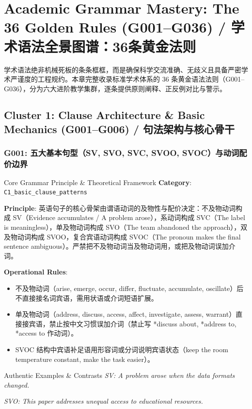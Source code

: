 \chapter{Academic Grammar Mastery: The 36 Golden Rules (G001--G036) / 学术语法全景图谱：36条黄金法则}\label{ch:grammar36}
学术语法绝非机械死板的条条框框，而是确保科学交流准确、无歧义且具备严密学术严谨度的工程规约。本章完整收录标准学术体系的 36 条黄金语法法则（G001--G036），分为六大进阶教学集群，逐条提供原则阐释、正反例对比与警示。

\section{Cluster 1: Clause Architecture \& Basic Mechanics (G001--G006) / 句法架构与核心骨干}
\subsection{G001: 五大基本句型（SV, SVO, SVC, SVOO, SVOC）与动词配价边界}\label{sec:rule:G001}
\begin{ConceptBox}{Core Grammar Principle \& Theoretical Framework}
\textbf{Category}: \texttt{C1\_basic\_clause\_patterns}\par\vspace{3pt}
\textbf{Principle}: 英语句子的核心骨架由谓语动词的及物性与配价决定：不及物动词构成 SV（Evidence accumulates / A problem arose），系动词构成 SVC（The label is meaningless），单及物动词构成 SVO（The team abandoned the approach），双及物动词构成 SVOO，复合宾语动词构成 SVOC（The pronoun makes the final sentence ambiguous）。严禁把不及物动词当及物动词用，或把及物动词误加介词。\par\vspace{4pt}
\textbf{Operational Rules}:
\begin{itemize}[leftmargin=1.5em, itemsep=1pt]
  \item 不及物动词（arise, emerge, occur, differ, fluctuate, accumulate, oscillate）后不直接接名词宾语，需用状语或介词短语扩展。
  \item 单及物动词（address, discuss, access, affect, investigate, assess, warrant）直接接宾语，禁止按中文习惯误加介词（禁止写 *discuss about, *address to, *access to 作动词）。
  \item SVOC 结构中宾语补足语用形容词或分词说明宾语状态（keep the room temperature constant, make the task easier）。
\end{itemize}
\end{ConceptBox}
\begin{ExampleBox}{Authentic Examples \& Contrasts}
\textit{SV: A problem arose when the data formats changed.}\par\vspace{2pt}
\textit{SVO: This paper addresses unequal access to educational resources.}\par\vspace{2pt}
\end{ExampleBox}
